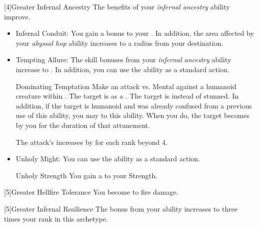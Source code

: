         [4]{Greater Infernal Ancestry} The benefits of your \textit{infernal ancestry} ability improve.
        \begin{itemize}
            \item Infernal Conduit: You gain a  bonus to your .
                In addition, the area affected by your \textit{abyssal hop} ability increases to a \smallarea radius from your destination.
            \item Tempting Allure: The skill bonuses from your \textit{infernal ancestry} ability increase to .
                In addition, you can use the  ability as a standard action.
                \begin{magicalactiveability}{Dominating Temptation}{}
                    \rankline
                    \noindent
                    Make an attack vs. Mental against a humanoid creature within \shortrange.%
                    \vspace{0.25em}
                    \hit The target is \stunned as a .
                    \crit The target is \confused instead of stunned.
                    In addition, if the target is humanoid and was already confused from a previous use of this ability, you may  to this ability.
                    When you do, the target becomes \dominated by you for the duration of that attunement.

                    \rankline
                    \noindent The attack's  increases by  for each rank beyond 4.
                    \vspace{0.1em}
                \end{magicalactiveability}
            \item Unholy Might: You can use the  ability as a standard action.
                \begin{magicalattuneability}{Unholy Strength}{}
                    \rankline
                    You gain a   to your Strength.
                \end{magicalattuneability}
        \end{itemize}

        [5]{Greater Hellfire Tolerance} You become  to fire damage.

        [5]{Greater Infernal Resilience}  The bonus from your  ability increases to three times your rank in this archetype.


